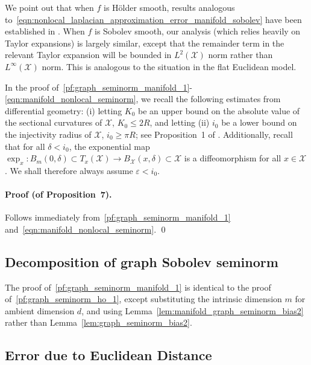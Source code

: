 \documentclass[aos]{imsart}
\theoremstyle{plain}
\theoremstyle{definition}
\theoremstyle{remark}
\newcommand{\mc}[1]{\mathcal{#1}}
\newcommand{\1}{\mathbf{1}}
\begin{document}
We point out that when $f$ is H\"{o}lder smooth, results analogous to~\eqref{eqn:nonlocal_laplacian_approximation_error_manifold_sobolev} have been established in \citet{calder2019}. When $f$ is Sobolev smooth, our analysis (which relies heavily on Taylor expansions) is largely similar, except that the remainder term in the relevant Taylor expansion will be bounded in $L^2(\mc{X})$ norm rather than $L^{\infty}(\mc{X})$ norm. This is analogous to the situation in the flat Euclidean model.

In the proof of~\eqref{pf:graph_seminorm_manifold_1}-\eqref{eqn:manifold_nonlocal_seminorm}, we recall the following estimates from differential geometry: (i) letting $K_0$ be an upper bound on the absolute value of the sectional curvatures of $\mc{X}$, $K_0 \leq 2R$, and  letting (ii) $i_0$ be a lower bound on the injectivity radius of $\mc{X}$, $i_0 \geq \pi R$; see Proposition~1 of \cite{aamari2019}. Additionally, recall that for all $\delta < i_0$, the exponential map $\exp_x: B_m(0,\delta) \subset T_x(\mc{X}) \to B_{\mc{X}}(x,\delta) \subset \mc{X}$ is a diffeomorphism for all $x \in \mc{X}$. We shall therefore always assume $\varepsilon < i_0$. 

\paragraph{Proof (of Proposition~7).} Follows immediately from~\eqref{pf:graph_seminorm_manifold_1} and~\eqref{eqn:manifold_nonlocal_seminorm}. \qed

\subsection{Decomposition of graph Sobolev seminorm}
\label{subsec:manifold_decomposition_graph_seminorm}
The proof of~\eqref{pf:graph_seminorm_manifold_1} is identical to the proof of~\eqref{pf:graph_seminorm_ho_1}, except substituting the intrinsic dimension $m$ for ambient dimension $d$, and using Lemma~\ref{lem:manifold_graph_seminorm_bias2} rather than Lemma~\ref{lem:graph_seminorm_bias2}.

\subsection{Error due to Euclidean Distance}
\label{subsec:error_euclidean_distance}
\end{document}
